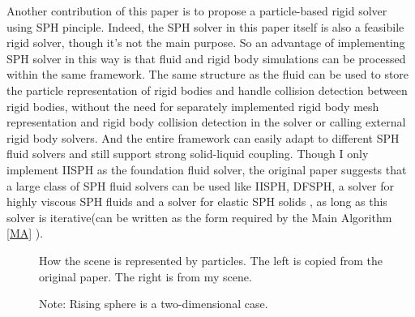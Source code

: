 \documentclass[acmlarge]{acmart}
\begin{document}
Another contribution of this paper is to propose a particle-based rigid solver using SPH pinciple.
Indeed, the SPH solver in this paper itself is also a feasibile rigid solver, though it's not the main purpose.
So an advantage of implementing SPH solver in this way is that 
fluid and rigid body simulations can be processed within the same framework. 
The same structure as the fluid can be used to store the particle representation of rigid bodies
 and handle collision detection between rigid bodies, 
 without the need for separately implemented rigid body mesh representation
 and rigid body collision detection in the solver or calling external rigid body solvers.
And the entire framework can easily adapt to different SPH fluid solvers and still support strong solid-liquid coupling.
Though I only implement IISPH as the foundation fluid solver, 
the original paper suggests that a large class of SPH fluid solvers can be used like IISPH, DFSPH, a solver for highly 
viscous SPH fluids\cite{VFSPH} and a solver for elastic SPH solids \cite{peer2018implicit}, 
as long as this solver is iterative(can be written as the form required by the Main Algorithm \ref{MA} ).
\begin{figure}[h]
  \centering
  \caption{How the scene is represented by particles. The left is copied from the original paper. The right is from my scene.}
\end{figure}
\begin{figure}[h]
  \centering
  \caption{Note: Rising sphere is a two-dimensional case.}
\end{figure}
\end{document}
